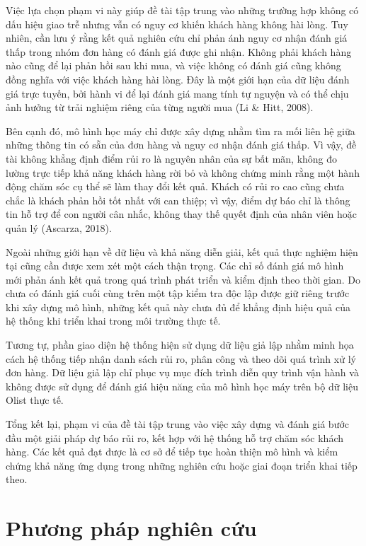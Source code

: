 \documentclass[12pt,a4paper]{report}
\begin{document}
Việc lựa chọn phạm vi này giúp đề tài tập trung vào những trường hợp không có dấu hiệu giao trễ nhưng vẫn có nguy cơ khiến khách hàng không hài lòng. Tuy nhiên, cần lưu ý rằng kết quả nghiên cứu chỉ phản ánh nguy cơ nhận đánh giá thấp trong nhóm đơn hàng có đánh giá được ghi nhận. Không phải khách hàng nào cũng để lại phản hồi sau khi mua, và việc không có đánh giá cũng không đồng nghĩa với việc khách hàng hài lòng. Đây là một giới hạn của dữ liệu đánh giá trực tuyến, bởi hành vi để lại đánh giá mang tính tự nguyện và có thể chịu ảnh hưởng từ trải nghiệm riêng của từng người mua (Li \& Hitt, 2008).

Bên cạnh đó, mô hình học máy chỉ được xây dựng nhằm tìm ra mối liên hệ giữa những thông tin có sẵn của đơn hàng và nguy cơ nhận đánh giá thấp. Vì vậy, đề tài không khẳng định điểm rủi ro là nguyên nhân của sự bất mãn, không đo lường trực tiếp khả năng khách hàng rời bỏ và không chứng minh rằng một hành động chăm sóc cụ thể sẽ làm thay đổi kết quả. Khách có rủi ro cao cũng chưa chắc là khách phản hồi tốt nhất với can thiệp; vì vậy, điểm dự báo chỉ là thông tin hỗ trợ để con người cân nhắc, không thay thế quyết định của nhân viên hoặc quản lý (Ascarza, 2018).

Ngoài những giới hạn về dữ liệu và khả năng diễn giải, kết quả thực nghiệm hiện tại cũng cần được xem xét một cách thận trọng. Các chỉ số đánh giá mô hình mới phản ánh kết quả trong quá trình phát triển và kiểm định theo thời gian. Do chưa có đánh giá cuối cùng trên một tập kiểm tra độc lập được giữ riêng trước khi xây dựng mô hình, những kết quả này chưa đủ để khẳng định hiệu quả của hệ thống khi triển khai trong môi trường thực tế.

Tương tự, phần giao diện hệ thống hiện sử dụng dữ liệu giả lập nhằm minh họa cách hệ thống tiếp nhận danh sách rủi ro, phân công và theo dõi quá trình xử lý đơn hàng. Dữ liệu giả lập chỉ phục vụ mục đích trình diễn quy trình vận hành và không được sử dụng để đánh giá hiệu năng của mô hình học máy trên bộ dữ liệu Olist thực tế.

Tổng kết lại, phạm vi của đề tài tập trung vào việc xây dựng và đánh giá bước đầu một giải pháp dự báo rủi ro, kết hợp với hệ thống hỗ trợ chăm sóc khách hàng. Các kết quả đạt được là cơ sở để tiếp tục hoàn thiện mô hình và kiểm chứng khả năng ứng dụng trong những nghiên cứu hoặc giai đoạn triển khai tiếp theo.

\section{Phương pháp nghiên cứu}
\label{sec:phuong-phap-nghien-cuu}
\end{document}
